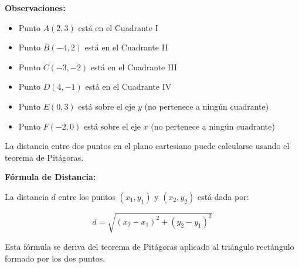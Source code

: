 \begin{example}
\textbf{Observaciones:}
\begin{itemize}
    \item Punto $A(2, 3)$ está en el Cuadrante I
    \item Punto $B(-4, 2)$ está en el Cuadrante II
    \item Punto $C(-3, -2)$ está en el Cuadrante III
    \item Punto $D(4, -1)$ está en el Cuadrante IV
    \item Punto $E(0, 3)$ está sobre el eje $y$ (no pertenece a ningún cuadrante)
    \item Punto $F(-2, 0)$ está sobre el eje $x$ (no pertenece a ningún cuadrante)
\end{itemize}
\end{example}


La distancia entre dos puntos en el plano cartesiano puede calcularse usando el teorema de Pitágoras.

\begin{definition}
\textbf{Fórmula de Distancia:}

La distancia $d$ entre los puntos $(x_1, y_1)$ y $(x_2, y_2)$ está dada por:

$$\boxed{d = \sqrt{(x_2 - x_1)^2 + (y_2 - y_1)^2}}$$

Esta fórmula se deriva del teorema de Pitágoras aplicado al triángulo rectángulo formado por los dos puntos.
\end{definition}

